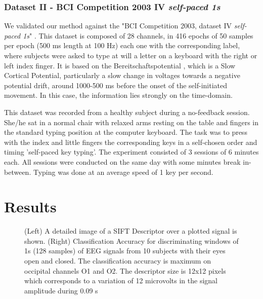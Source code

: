 \subsubsection{Dataset II - BCI Competition 2003 IV \textit{self-paced 1s}}
We validated our method against the "BCI Competition 2003, dataset IV \textit{self-paced 1s}" \cite{c51}. This dataset is composed of 28 channels, in 416 epochs of 50 samples per epoch (500 ms length at 100 Hz) each one with the corresponding label, where subjects were asked to type at will a letter on a keyboard with the right or left index finger.  It is based on the Bereitschaftspotential \cite{c52}, which is a Slow Cortical Potential, particularly a slow change in voltages towards a negative potential drift, around 1000-500 ms before the onset of the self-initiated movement.  In this case, the information lies strongly on the time-domain.

This dataset was recorded from a healthy subject during a no-feedback session. She/he sat in a normal chair with relaxed arms resting on the table and fingers in the standard typing position at the computer keyboard. The task was to press with the index and little fingers the corresponding keys in a self-chosen order and timing 'self-paced key typing'. The experiment consisted of 3 sessions of 6 minutes each. All sessions were conducted on the same day with some minutes break in-between. Typing was done at an average speed of 1 key per second.  

\section{Results}

  \begin{figure}[thpb]
      \centering
      \setlength\fboxsep{0pt}
	  \setlength\fboxrule{0.5pt}
      \caption[Alpha Waves Classification]{(Left) A detailed image of a SIFT Descriptor over a plotted signal is shown.  (Right) Classification Accuracy for discriminating windows of 1s (128 samples) of EEG signals from 10 subjects with their eyes open and closed.  The classification accuracy is maximum on occipital channels O1 and O2. The descriptor size is 12x12 pixels which corresponds to a variation of 12 microvolts in the signal amplitude during 0.09 s}
      \label{figure1}
   \end{figure}
   
